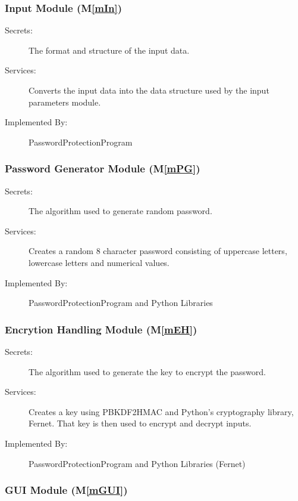 \documentclass[12pt, titlepage]{article}
\newcommand{\mref}[1]{M\ref{#1}}
\begin{document}
\subsubsection{Input Module (\mref{mIn})}

\begin{description}
\item[Secrets:] The format and structure of the input data.
\item[Services:] Converts the input data into the data structure used by the
  input parameters module.
\item[Implemented By:] PasswordProtectionProgram
\end{description}

\subsubsection{Password Generator Module (\mref{mPG})}

\begin{description}
\item[Secrets:] The algorithm used to generate random password.
\item[Services:] Creates a random 8 character password consisting of uppercase letters, lowercase letters and numerical values.
\item[Implemented By:] PasswordProtectionProgram and Python Libraries
\end{description}

\subsubsection{Encrytion Handling Module (\mref{mEH})}

\begin{description}
\item[Secrets:] The algorithm used to generate the key to encrypt the password.
\item[Services:] Creates a key using PBKDF2HMAC and Python's cryptography library, Fernet. That key is then used to encrypt and decrypt inputs.
\item[Implemented By:] PasswordProtectionProgram and Python Libraries (Fernet)
\end{description}

\subsubsection{GUI Module (\mref{mGUI})}
\end{document}
